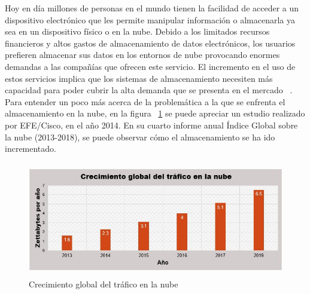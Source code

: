 Hoy en día millones de personas en el mundo tienen la facilidad de acceder a un dispositivo electrónico que les permite manipular información o almacenarla ya sea en un dispositivo físico o en la nube.
Debido a los limitados recursos financieros y altos gastos de almacenamiento de datos electrónicos, los usuarios prefieren almacenar sus datos en los entornos de nube provocando enormes demandas a las compañías que ofrecen este servicio. El incremento en el uso de estos servicios implica que los sistemas de almacenamiento necesiten más capacidad para poder cubrir la alta demanda que se presenta en el mercado ~\cite{Keelveedhi}. \\


Para entender un poco más acerca de la problemática a la que se enfrenta el almacenamiento en la nube, en la figura ~\ref{fig:1-1-1} se puede apreciar un estudio realizado por EFE/Cisco, en el año 2014. En su cuarto informe anual Índice Global sobre la nube (2013-2018), se puede observar c\'omo el almacenamiento se ha ido incrementado. \\

\begin{figure}[H]
\centering
\includegraphics[width=13cm, height=5cm]{./images/crecimientoNube.JPG}
\caption{Crecimiento global del tráfico en la nube}
\label{fig:1-1-1}
\end{figure}

